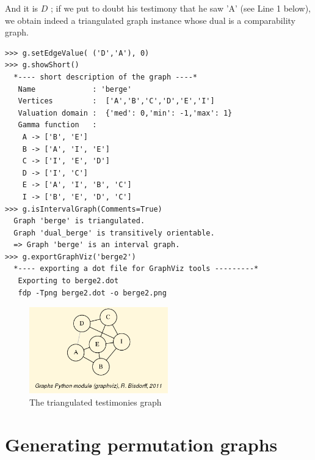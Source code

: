 And it is $D$ ; if we put to doubt his testimony that he saw 'A' (see Line 1 below), we obtain indeed a triangulated graph instance whose dual is a comparability graph.
\begin{lstlisting}
>>> g.setEdgeValue( ('D','A'), 0)
>>> g.showShort()
  *---- short description of the graph ----*
   Name             : 'berge'
   Vertices         :  ['A','B','C','D','E','I']
   Valuation domain :  {'med': 0,'min': -1,'max': 1}
   Gamma function   : 
    A -> ['B', 'E']
    B -> ['A', 'I', 'E']
    C -> ['I', 'E', 'D']
    D -> ['I', 'C']
    E -> ['A', 'I', 'B', 'C']
    I -> ['B', 'E', 'D', 'C']
>>> g.isIntervalGraph(Comments=True)
  Graph 'berge' is triangulated.
  Graph 'dual_berge' is transitively orientable.
  => Graph 'berge' is an interval graph.
>>> g.exportGraphViz('berge2')
  *---- exporting a dot file for GraphViz tools ---------*
   Exporting to berge2.dot
   fdp -Tpng berge2.dot -o berge2.png
\end{lstlisting}
\begin{figure}[h]
\sidecaption
\includegraphics[width=6cm]{Figures/berge2.png}
\caption{The triangulated testimonies graph} 
\label{fig:25.3}       %
\end{figure}

\section{Generating permutation graphs}
\label{sec:25.3}

